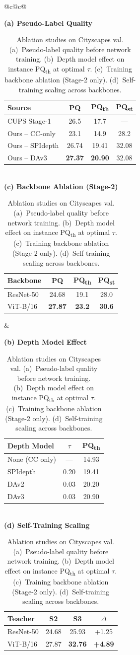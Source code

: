 \documentclass{bmvc2k}
\newcommand{\pqt}{PQ\textsubscript{th}\xspace}
\newcommand{\pqs}{PQ\textsubscript{st}\xspace}
\begin{document}
\begin{table}[t]
\centering
\caption{Ablation studies on Cityscapes val. (a)~Pseudo-label quality before network training. (b)~Depth model effect on instance \pqt at optimal $\tau$. (c)~Training backbone ablation (Stage-2 only). (d)~Self-training scaling across backbones.}
\label{tab:ablations}
\small
\begin{tabular}{@{}c@{\hspace{16pt}}c@{}}
\begin{minipage}[t]{0.46\textwidth}
\centering
\textbf{(a) Pseudo-Label Quality} \\[4pt]
\begin{tabular}{@{}lccc@{}}
\toprule
Source & PQ & \pqt & \pqs \\
\midrule
CUPS Stage-1~\cite{hahn2025cups} & 26.5 & 17.7 & --- \\
Ours -- CC-only & 23.1 & 14.9 & 28.2 \\
Ours -- SPIdepth & 26.74 & 19.41 & 32.08 \\
Ours -- DAv3 & \textbf{27.37} & \textbf{20.90} & 32.08 \\
\bottomrule
\end{tabular}
\\[14pt]
\textbf{(c) Backbone Ablation (Stage-2)} \\[4pt]
\begin{tabular}{@{}lccc@{}}
\toprule
Backbone & PQ & \pqt & \pqs \\
\midrule
ResNet-50 & 24.68 & 19.1 & 28.0 \\
ViT-B/16 & \textbf{27.87} & \textbf{23.2} & \textbf{30.6} \\
\bottomrule
\end{tabular}
\end{minipage}
&
\begin{minipage}[t]{0.46\textwidth}
\centering
\textbf{(b) Depth Model Effect} \\[4pt]
\begin{tabular}{@{}lcc@{}}
\toprule
Depth Model & $\tau$ & \pqt \\
\midrule
None (CC only) & --- & 14.93 \\
SPIdepth~\cite{lavreniuk2025spidepth} & 0.20 & 19.41 \\
DAv2~\cite{yang2024da2} & 0.03 & 20.20 \\
DAv3~\cite{lin2025da3} & 0.03 & 20.90 \\
\bottomrule
\end{tabular}
\\[14pt]
\textbf{(d) Self-Training Scaling} \\[4pt]
\begin{tabular}{@{}lccc@{}}
\toprule
Teacher & S2 & S3 & $\Delta$ \\
\midrule
ResNet-50 & 24.68 & 25.93 & +1.25 \\
ViT-B/16 & 27.87 & \textbf{32.76} & \textbf{+4.89} \\
\bottomrule
\end{tabular}
\end{minipage}
\end{tabular}
\end{table}
\end{document}
